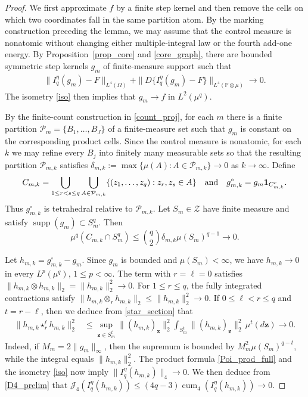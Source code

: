 \documentclass[letterpaper,11pt,reqno]{amsart}
\numberwithin{equation}{section}
\theoremstyle{plain}
\theoremstyle{definition}
\theoremstyle{remark}
\newcommand{\PP}{\mathbb{P}}
\newcommand{\ind}{\mathbf{1}}
\newcommand{\sZ}{\mathscr{Z}}
\DeclareMathOperator{\cum}{cum}
\DeclareMathOperator{\supp}{supp}
\newcommand{\noi}{\noindent}
\newcommand{\dd}{d}
\newcommand{\ot}{\otimes}
\newcommand{\Jfour}{\mathcal J_4}
\newcommand{\AND}{\quad{\rm and}\quad}
\begin{document}
\begin{proof}
We first approximate $f$ by a finite step kernel and then remove the
cells on which two coordinates fall in the same partition atom.  By
the marking construction preceding the lemma, we may assume that
the control measure is nonatomic without changing either
multiple-integral law or the fourth add-one energy.  By
Proposition~\ref{prop_core} and \eqref{core_graph}, there are
bounded symmetric step kernels $g_m$ of finite-measure support such
that
\noi
\begin{align*}
 \|I_q^\eta(g_m)-F\|_{L^4(\Omega)}
 +\|D\{I_q^\eta(g_m)-F\}\|_{L^4(\PP\ot\mu)}
 \longrightarrow0.
\end{align*}
The isometry \eqref{iso} then implies that
$g_m\to f$ in $L^2(\mu^q)$.

By the finite-count construction in \eqref{count_proj}, for each
$m$ there is a finite partition
$\mathcal P_m=\{B_1,\ldots,B_J\}$ of a finite-measure set such that
$g_m$ is constant on the corresponding product cells.  Since the control
measure is nonatomic, for each $k$ we may refine every $B_j$ into
finitely many measurable sets so that the resulting partition
$\mathcal P_{m,k}$ satisfies
$\delta_{m,k}:=\max\{\mu(A):A\in\mathcal P_{m,k}\}\to0$
as $k\to\infty$.
Define
\[
 C_{m,k}=
 \bigcup_{1\leq r<s\leq q}
 \bigcup_{A\in\mathcal P_{m,k}}
 \{(z_1,\ldots,z_q):z_r,z_s\in A\}
 \AND
 g_{m,k}^{\circ}=g_m\ind_{C_{m,k}^c}.
\]
Thus $g_{m,k}^{\circ}$ is tetrahedral relative to
$\mathcal P_{m,k}$.  Let $S_m\in\sZ$ have finite measure and satisfy
$\supp(g_m)\subset S_m^q$.  Then
\[
 \mu^q(C_{m,k}\cap S_m^q)
 \leq
 \binom q2
 \delta_{m,k}\mu(S_m)^{q-1}
 \longrightarrow0.
\]

Let $h_{m,k}=g_{m,k}^{\circ}-g_m$.  Since $g_m$ is bounded and
$\mu(S_m)<\infty$, we have $h_{m,k}\to0$ in every
$L^p(\mu^q)$, $1\leq p<\infty$.  The term with $r=\ell=0$ satisfies
$\|h_{m,k}\otimes h_{m,k}\|_2=\|h_{m,k}\|_2^2\to0$.
For $1\leq r\leq q$, the fully integrated contractions satisfy
$\|h_{m,k}\otimes_r h_{m,k}\|_2\leq\|h_{m,k}\|_2^2\to0$.
If $0\leq\ell<r\leq q$ and $t=r-\ell$, then we deduce from
\eqref{star_section} that
\noi
\begin{align*}
 \|h_{m,k}\star_r^\ell h_{m,k}\|_2^2
 &\leq\sup_{\boldsymbol z\in S_m^t}
 \|(h_{m,k})_{\boldsymbol z}\|_2^2
 \int_{S_m^t}\|(h_{m,k})_{\boldsymbol z}\|_2^2
 \,\mu^t(\dd\boldsymbol z)\longrightarrow0.
\end{align*}
Indeed, if $M_m=2\|g_m\|_\infty$, then the supremum is bounded by
$M_m^2\mu(S_m)^{q-t}$, while the integral equals
$\|h_{m,k}\|_2^2$.  The product formula \eqref{Poi_prod_full} and the
isometry \eqref{iso} now imply
$\|I_q^\eta(h_{m,k})\|_4\to0$.  We then deduce from
\eqref{D4_prelim} that
$\Jfour(I_q^\eta(h_{m,k}))\leq(4q-3)
\cum_4(I_q^\eta(h_{m,k}))\to0$.



\end{proof}
\end{document}
